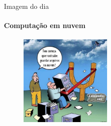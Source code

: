 \documentclass{beamer}
\begin{document}
\begin{frame}[fragile]{Imagem do dia}
      \framesubtitle{Computação em nuvem}
	\begin{figure}[H]
		\centerline{\includegraphics[width=0.4\textwidth]{assets/imagem-do-dia/arquivos-na-nuvem-estilingue.jpg}}

	\end{figure}
\end{frame}
\footlinecolor{}

\backmatter
\end{document}
